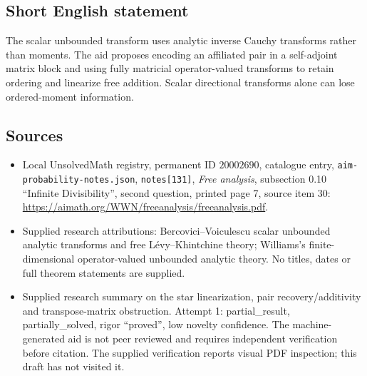 \documentclass[11pt]{article}
\begin{document}
\subsection{Short English statement}
The scalar unbounded transform uses analytic inverse Cauchy transforms rather than moments. The aid proposes encoding an affiliated pair in a self-adjoint matrix block and using fully matricial operator-valued transforms to retain ordering and linearize free addition. Scalar directional transforms alone can lose ordered-moment information.
\subsection{Sources}
\begin{itemize}
\item Local UnsolvedMath registry, permanent ID \(20002690\), catalogue entry, \texttt{aim-probability-notes.json}, \texttt{notes[131]}, \emph{Free analysis}, subsection 0.10 ``Infinite Divisibility'', second question, printed page 7, source item 30: \url{https://aimath.org/WWN/freeanalysis/freeanalysis.pdf}.
\item Supplied research attributions: Bercovici--Voiculescu scalar unbounded analytic transforms and free L\'evy--Khintchine theory; Williams's finite-dimensional operator-valued unbounded analytic theory. No titles, dates or full theorem statements are supplied.
\item Supplied research summary on the star linearization, pair recovery/additivity and transpose-matrix obstruction. Attempt 1: partial\_result, partially\_solved, rigor ``proved'', low novelty confidence. The machine-generated aid is not peer reviewed and requires independent verification before citation. The supplied verification reports visual PDF inspection; this draft has not visited it.
\end{itemize}
\end{document}
